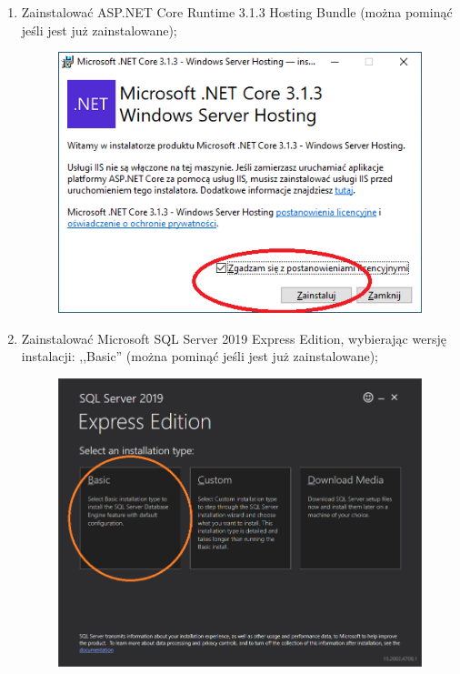 \documentclass[12pt,a4paper]{article}
\begin{document}
\begin{enumerate}
\begin{figure}[H]
						\centering
					\end{figure}		
				\item Zainstalować ASP.NET Core Runtime 3.1.3 Hosting Bundle (można pominąć jeśli jest już zainstalowane);
					\begin{figure}[H]
						\includegraphics[scale=0.5]{img/Local_Install_3.png}
						\centering
					\end{figure}
				\item Zainstalować Microsoft SQL Server 2019 Express Edition, wybierając wersję instalacji: ,,Basic'' (można pominąć jeśli jest już zainstalowane);
					\begin{figure}[H]
						\includegraphics[scale=0.3]{img/Local_Install_4.png}
						\centering
					\end{figure}

\end{enumerate}
\end{document}
